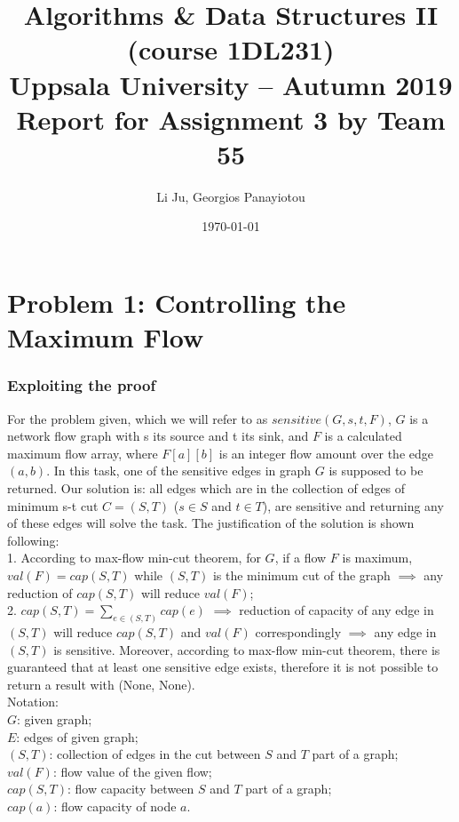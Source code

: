 \documentclass[a4paper,11pt]{article}
\title{\textbf{Algorithms \& Data Structures II (course 1DL231) \\
    Uppsala University -- Autumn 2019 \\
    Report for Assignment 3
    by Team 55}}
\author{Li Ju, Georgios Panayiotou}
\date{\today}
\begin{document}
\maketitle

\part{Problem 1: Controlling the Maximum Flow}
\section{Exploiting the proof}

For the problem given, which we will refer to as $sensitive(G,s,t,F)$, $G$ is a network flow graph with s its source and t its sink, and $F$ is a calculated maximum flow array, where $F[a][b]$ is an integer flow amount over the edge $(a,b)$. In this task, one of the sensitive edges in graph $G$ is supposed to be returned. Our solution is: all edges which are in the collection of edges of minimum s-t cut $C=(S, T)$ ($s\in S$ and $t \in T$), are sensitive and returning any of these edges will solve the task. The justification of the solution is shown following: \\

1. According to max-flow min-cut theorem, for $G$, if a flow $F$ is maximum, $val(F)=cap(S,T)$ while $(S, T)$ is the minimum cut of the graph $\implies$ any reduction of $cap(S, T)$ will reduce $val(F)$; \\

2. $cap(S, T) = \sum\nolimits_{e \in (S, T)} cap(e)$ $\implies$ reduction of capacity of any edge in $(S, T)$ will reduce $cap(S, T)$ and $val(F)$ correspondingly $\implies$ any edge in $(S, T)$ is sensitive. Moreover, according to max-flow min-cut theorem, there is guaranteed that at least one sensitive edge exists, therefore it is not possible to return a result with (None, None).\\

Notation: \\$G$: given graph; \\$E$: edges of given graph; \\$(S, T)$: collection of edges in the cut between $S$ and $T$ part of a graph;\\
$val(F)$: flow value of the given flow; \\$cap(S, T)$: flow capacity between $S$ and $T$ part of a graph; \\
$cap(a)$: flow capacity of node $a$. \\
\end{document}
